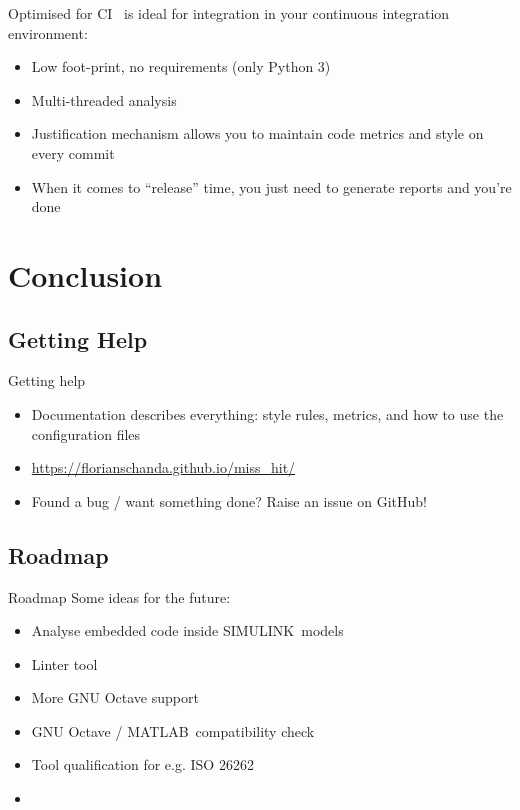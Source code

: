 \documentclass{beamer}
\newcommand{\mh}[0]{{\sc\structure{Miss\_Hit}}}
\begin{document}
\begin{frame}{Optimised for CI}
  \mh~is ideal for integration in your continuous integration
  environment:
  \begin{itemize}
  \item Low foot-print, no requirements (only Python 3)
  \item Multi-threaded analysis
  \item Justification mechanism allows you to maintain code metrics
    and style on every commit
  \item When it comes to ``release'' time, you just need to generate
    reports and you're done
  \end{itemize}
\end{frame}

\section{Conclusion}
\subsection{Getting Help}
\begin{frame}{Getting help}
  \begin{itemize}
  \item Documentation describes everything: style rules, metrics, and
    how to use the configuration files
  \item \url{https://florianschanda.github.io/miss_hit/}
    \pause
  \item Found a bug / want something done? Raise an issue on GitHub!
  \end{itemize}
\end{frame}

\subsection{Roadmap}
\begin{frame}{Roadmap}
  Some ideas for the future:
  \begin{itemize}
  \item Analyse embedded code inside SIMULINK\texttrademark\ models
  \item Linter tool
  \item More GNU Octave support
  \item GNU Octave / MATLAB\texttrademark\ compatibility check
  \item Tool qualification for e.g. ISO 26262
    \pause
  \item {}
  \end{itemize}
\end{frame}
\end{document}
